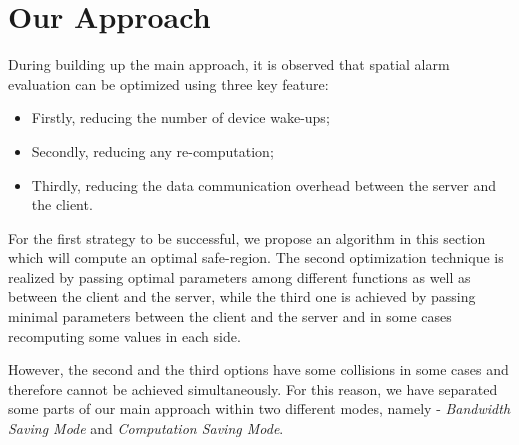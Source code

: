 \chapter{Our Approach}
\label{chap:ourapp}




During building up the main approach, it is observed that spatial alarm evaluation can be optimized using three key feature: 
\begin{itemize}
\setlength\itemsep{0em}
\item Firstly, reducing the number of device wake-ups;
\item Secondly, reducing any re-computation;
\item Thirdly, reducing the data communication overhead between the server and the client.
\end{itemize}

For the first strategy to be successful, we propose an algorithm in this section which will compute an optimal safe-region. The second optimization technique is realized by passing optimal parameters among different functions as well as between the client and the server, while the third one is achieved by passing minimal parameters between the client and the server and in some cases recomputing some values in each side.

However, the second and the third options have some collisions in some cases and therefore cannot be achieved simultaneously. For this reason, we have separated some parts of our main approach within two different modes, namely - \textit{Bandwidth Saving Mode} and \textit{Computation Saving Mode}.

